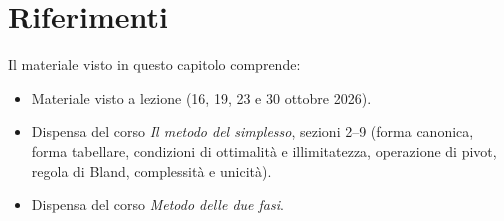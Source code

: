 \section*{Riferimenti}
Il materiale visto in questo capitolo comprende:
\begin{itemize}
    \item Materiale visto a lezione (16, 19, 23 e 30 ottobre 2026).
    \item Dispensa del corso \emph{Il metodo del simplesso}, sezioni 2--9 (forma canonica, forma tabellare, condizioni di ottimalità e illimitatezza, operazione di pivot, regola di Bland, complessità e unicità).
    \item Dispensa del corso \emph{Metodo delle due fasi}.
\end{itemize}
